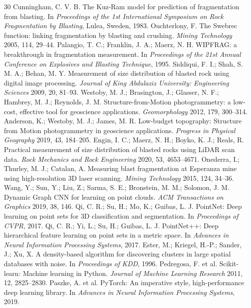 \documentclass[11pt]{article}
\begin{document}
\begin{thebibliography}{30}
 Cunningham, C. V. B. The Kuz-Ram model for prediction of fragmentation from blasting. In \emph{Proceedings of the 1st International Symposium on Rock Fragmentation by Blasting}, Lulea, Sweden, 1983.
 Ouchterlony, F. The Swebrec function: linking fragmentation by blasting and crushing. \emph{Mining Technology} 2005, 114, 29--44.
 Palangio, T. C.; Franklin, J. A.; Maerz, N. H. WIPFRAG: a breakthrough in fragmentation measurement. In \emph{Proceedings of the 21st Annual Conference on Explosives and Blasting Technique}, 1995.
 Siddiqui, F. I.; Shah, S. M. A.; Behan, M. Y. Measurement of size distribution of blasted rock using digital image processing. \emph{Journal of King Abdulaziz University: Engineering Sciences} 2009, 20, 81--93.
 Westoby, M. J.; Brasington, J.; Glasser, N. F.; Hambrey, M. J.; Reynolds, J. M. Structure-from-Motion photogrammetry: a low-cost, effective tool for geoscience applications. \emph{Geomorphology} 2012, 179, 300--314.
 Anderson, K.; Westoby, M. J.; James, M. R. Low-budget topography: Structure from Motion photogrammetry in geoscience applications. \emph{Progress in Physical Geography} 2019, 43, 184--205.
 Engin, I. C.; Maerz, N. H.; Boyko, K. J.; Reals, R. Practical measurement of size distribution of blasted rocks using LiDAR scan data. \emph{Rock Mechanics and Rock Engineering} 2020, 53, 4653--4671.
 Onederra, I.; Thurley, M. J.; Catalan, A. Measuring blast fragmentation at Esperanza mine using high-resolution 3D laser scanning. \emph{Mining Technology} 2015, 124, 34--36.
 Wang, Y.; Sun, Y.; Liu, Z.; Sarma, S. E.; Bronstein, M. M.; Solomon, J. M. Dynamic Graph CNN for learning on point clouds. \emph{ACM Transactions on Graphics} 2019, 38, 146.
 Qi, C. R.; Su, H.; Mo, K.; Guibas, L. J. PointNet: Deep learning on point sets for 3D classification and segmentation. In \emph{Proceedings of CVPR}, 2017.
 Qi, C. R.; Yi, L.; Su, H.; Guibas, L. J. PointNet++: Deep hierarchical feature learning on point sets in a metric space. In \emph{Advances in Neural Information Processing Systems}, 2017.
 Ester, M.; Kriegel, H.-P.; Sander, J.; Xu, X. A density-based algorithm for discovering clusters in large spatial databases with noise. In \emph{Proceedings of KDD}, 1996.
 Pedregosa, F. et al. Scikit-learn: Machine learning in Python. \emph{Journal of Machine Learning Research} 2011, 12, 2825--2830.
 Paszke, A. et al. PyTorch: An imperative style, high-performance deep learning library. In \emph{Advances in Neural Information Processing Systems}, 2019.
\end{thebibliography}
\end{document}
